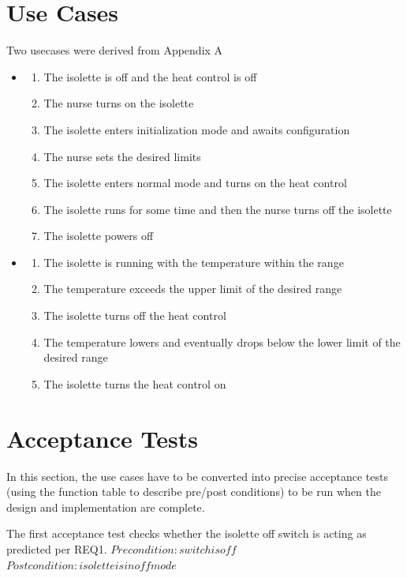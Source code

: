 \documentclass[fontsize=12pt,paper=letter,twoside]{scrartcl}
\begin{document}
\section{Use Cases}
Two usecases were derived from \cite{REMH} Appendix A
\begin{itemize}
    \item \begin{enumerate}
        \item The isolette is off and the heat control is off
        \item The nurse turns on the isolette
        \item The isolette enters initialization mode and awaits configuration
        \item The nurse sets the desired limits
        \item The isolette enters normal mode and turns on the heat control
        \item The isolette runs for some time and then the nurse turns off the isolette
        \item The isolette powers off
    \end{enumerate}

    \item \begin{enumerate}
        \item The isolette is running with the temperature within the range
        \item The temperature exceeds the upper limit of the desired range
        \item The isolette turns off the heat control
        \item The temperature lowers and eventually drops below the lower limit of the desired range
        \item The isolette turns the heat control on
    \end{enumerate}
\end{itemize}
\section{Acceptance Tests}
In this section, the use cases have to be converted into precise acceptance tests (using the function table to describe pre/post conditions) to be run when the design and implementation are complete.

\noindent The first acceptance test checks whether the isolette off switch is acting as predicted per REQ1.
$Precondition: switch is off$
$Postcondition: isolette is in off mode$
\end{document}
